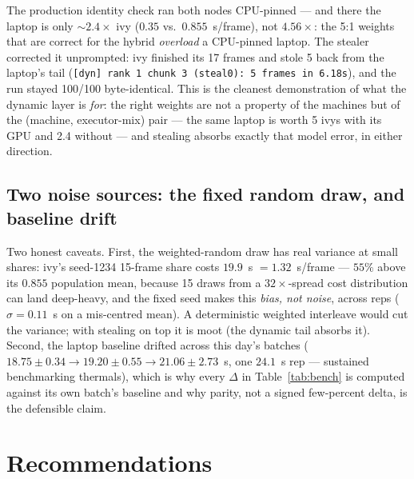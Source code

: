 \documentclass[
	english,
	letterpaper, oneside
]{article}
\begin{document}
The production identity check ran both nodes CPU-pinned --- and there the
laptop is only $\sim$$2.4\times$ ivy ($0.35$ vs.\ $0.855$~s/frame), not
$4.56\times$: the 5:1 weights that are correct for the hybrid
\emph{overload} a CPU-pinned laptop. The stealer corrected it unprompted:
ivy finished its 17 frames and stole 5 back from the laptop's tail
(\texttt{[dyn] rank 1 chunk 3 (steal0): 5 frames in 6.18s}), and the run
stayed 100/100 byte-identical. This is the cleanest demonstration of what
the dynamic layer is \emph{for}: the right weights are not a property of
the machines but of the (machine, executor-mix) pair --- the same laptop is
worth 5 ivys with its GPU and 2.4 without --- and stealing absorbs exactly
that model error, in either direction.

\subsection{Two noise sources: the fixed random draw, and baseline drift}
\label{sec:variance}
\label{sec:noise}

Two honest caveats. First, the weighted-random draw has real variance at
small shares: ivy's seed-1234 15-frame share costs $19.9$~s $= 1.32$~s/frame
--- $55\%$ above its $0.855$ population mean, because 15 draws from a
$32\times$-spread cost distribution can land deep-heavy, and the fixed seed
makes this \emph{bias, not noise}, across reps ($\sigma=0.11$~s on a
mis-centred mean). A deterministic weighted interleave would cut the
variance; with stealing on top it is moot (the dynamic tail absorbs it).
Second, the laptop baseline drifted across this day's batches
($18.75\pm0.34 \to 19.20\pm0.55 \to 21.06\pm2.73$~s, one $24.1$~s rep ---
sustained benchmarking thermals), which is why every $\Delta$ in
Table~\ref{tab:bench} is computed against its own batch's baseline and why
parity, not a signed few-percent delta, is the defensible claim.

\section{Recommendations}
\label{sec:recommendations}
\end{document}
